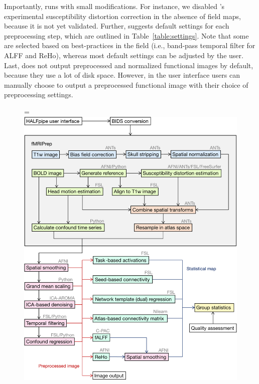 Importantly,  runs  with small modifications. For instance, we disabled ’s experimental susceptibility distortion correction in the absence of field maps, because it is not yet validated. Further,  suggests default settings for each preprocessing step, which are outlined in Table~\ref{table:settings}. Note that some are selected based on best-practices in the field (i.e., band-pass temporal filter for ALFF and ReHo), whereas most default settings can be adjusted by the user. Last,  does not output preprocessed and normalized functional images by default, because they use a lot of disk space. However, in the user interface users can manually choose to output a preprocessed functional image with their choice of preprocessing settings.

\begin{figure}[!tb]
    \begin{adjustwidth}{-2.4cm}{}
        \hsize=\linewidth%
        \includegraphics[width=\linewidth]{fig/workflow/workflow-crop}

\end{adjustwidth}
\end{figure}
